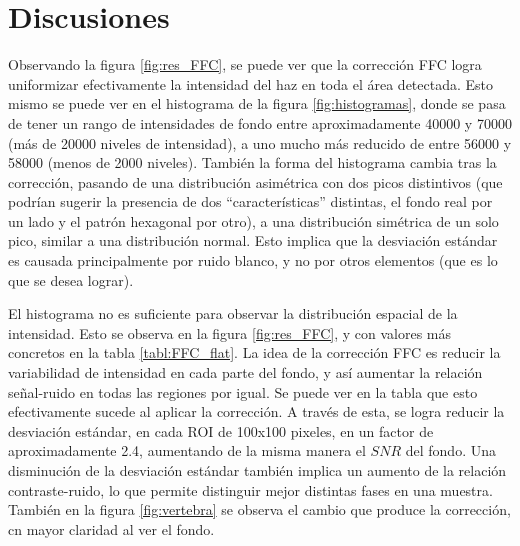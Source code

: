 \section{Discusiones}

Observando la figura \ref{fig:res_FFC}, se puede ver que la corrección FFC logra uniformizar efectivamente
la intensidad del haz en toda el área detectada. Esto mismo se puede ver en el histograma de la figura
\ref{fig:histogramas}, donde se pasa de tener un rango de intensidades de fondo entre aproximadamente
40000 y 70000 (más de 20000 niveles de intensidad), a uno mucho más reducido de entre 56000 y 58000
(menos de 2000 niveles). También la forma del histograma cambia tras la corrección, pasando de una distribución
asimétrica con dos picos distintivos (que podrían sugerir la presencia de dos ``características'' distintas,
el fondo real por un lado y el patrón hexagonal por otro), a una distribución simétrica de un solo pico,
similar a una distribución normal. Esto implica que la desviación estándar es causada principalmente por
ruido blanco, y no por otros elementos (que es lo que se desea lograr).

El histograma no es suficiente para observar la distribución espacial de la intensidad. Esto se observa
en la figura \ref{fig:res_FFC}, y con valores más concretos en la tabla \ref{tabl:FFC_flat}. La idea
de la corrección FFC es reducir la variabilidad de intensidad en cada parte del fondo, y así aumentar
la relación señal-ruido en todas las regiones por igual. Se puede ver en la tabla que esto efectivamente
sucede al aplicar la corrección. A través de esta, se logra reducir la desviación estándar, en cada ROI de
100x100 pixeles, en un factor de aproximadamente 2.4, aumentando de la misma manera el $SNR$ del fondo.
Una disminución de la desviación estándar también implica un aumento de la relación contraste-ruido, lo
que permite distinguir mejor distintas fases en una muestra. También en la figura \ref{fig:vertebra} se
observa el cambio que produce la corrección, cn mayor claridad al ver el fondo.

